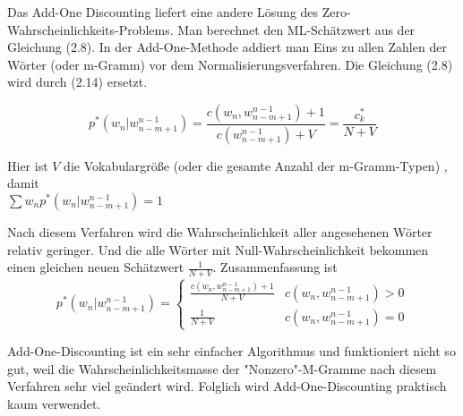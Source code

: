 Das Add-One Discounting liefert eine andere L\"osung des Zero-Wahrscheinlichkeits-Problems. Man berechnet den ML-Sch\"atzwert aus der Gleichung (2.8). In der Add-One-Methode addiert man Eins zu allen Zahlen der W\"orter (oder m-Gramm) vor dem Normalisierungsverfahren.  Die Gleichung (2.8) wird durch (2.14) ersetzt.

\begin{equation}
\label{equation:add_one_01}
p^{*}(w_{n}|w_{n-m+1}^{n-1})=\frac{c(w_{n},w_{n-m+1}^{n-1})+1}{c(w_{n-m+1}^{n-1})+V}=\frac{c_{k}^{*}}{N+V}
\end{equation}

Hier ist $V$ die Vokabulargr\"o\ss e (oder die gesamte Anzahl der m-Gramm-Typen) , damit \\ 
$\sum{w_{n}}p^{*}(w_{n}|w_{n-m+1}^{n-1})=1$

Nach diesem Verfahren wird die Wahrscheinlichkeit aller angesehenen W\"orter relativ geringer. Und die alle W\"orter mit Null-Wahrscheinlichkeit bekommen einen gleichen neuen Sch\"atzwert $\frac{1}{N+V}$. Zusammenfassung ist
\begin{equation}
p^{*}(w_{n}|w_{n-m+1}^{n-1})=\begin{cases}
\frac{c(w_{n},w_{n-m+1}^{n-1})+1}{N+V} & c(w_{n},w_{n-m+1}^{n-1})>0 \\
\frac{1}{N+V} & c(w_{n},w_{n-m+1}^{n-1})=0 
\end{cases}
\end{equation}

Add-One-Discounting ist ein sehr einfacher Algorithmus und funktioniert nicht so gut, weil die Wahrscheinlichkeitsmasse der "Nonzero"-M-Gramme nach diesem Verfahren sehr viel ge\"andert wird\cite{book_speech}. Folglich wird Add-One-Discounting  praktisch kaum verwendet.